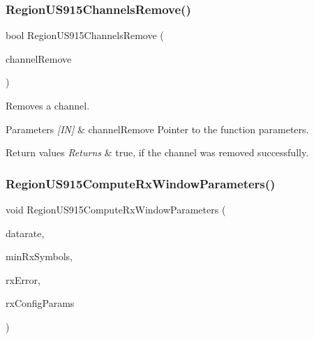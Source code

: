 \subsubsection{\texorpdfstring{Region\+U\+S915\+Channels\+Remove()}{RegionUS915ChannelsRemove()}}
{\footnotesize\ttfamily bool Region\+U\+S915\+Channels\+Remove (\begin{DoxyParamCaption}\item[{\hyperlink{group__REGION_gaa37468560d2fc81a977b57a48e5d72c0}{Channel\+Remove\+Params\+\_\+t} $\ast$}]{channel\+Remove }\end{DoxyParamCaption})}



Removes a channel. 


\begin{DoxyParams}{Parameters}
{\em \mbox{[}\+I\+N\mbox{]}} & channel\+Remove Pointer to the function parameters.\\
\hline
\end{DoxyParams}

\begin{DoxyRetVals}{Return values}
{\em Returns} & true, if the channel was removed successfully. \\
\hline
\end{DoxyRetVals}
\mbox{\label{group__REGIONUS915_gad480c9c758da7477276d2dc659db2f66}} 
\subsubsection{\texorpdfstring{Region\+U\+S915\+Compute\+Rx\+Window\+Parameters()}{RegionUS915ComputeRxWindowParameters()}}
{\footnotesize\ttfamily void Region\+U\+S915\+Compute\+Rx\+Window\+Parameters (\begin{DoxyParamCaption}\item[{int8\+\_\+t}]{datarate,  }\item[{uint8\+\_\+t}]{min\+Rx\+Symbols,  }\item[{uint32\+\_\+t}]{rx\+Error,  }\item[{\hyperlink{group__REGION_ga375c038078dfcfc7ef14280021db719e}{Rx\+Config\+Params\+\_\+t} $\ast$}]{rx\+Config\+Params }\end{DoxyParamCaption})}

